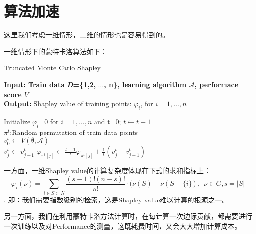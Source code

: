 \section{算法加速}
这里我们考虑一维情形，二维的情形也是容易得到的。

一维情形下的蒙特卡洛算法如下\cite{ghorbani2019data}：
\begin{algorithm}[H]
	\caption{Truncated Monte Carlo Shapley}%
	\label{alg1}
	\hspace*{0.02in} {\bf Input: Train data \textsl{D}=\{1,2, $\dots$, n\}, learning algorithm $\mathcal{A}$, performace score $V$}\\ %
	\hspace*{0.02in} {\bf Output:} %
	Shapley value of training points: $\varphi_{i}$, for $i=1,\dots,n$
	\begin{algorithmic}[1]
		\State Initialize $\varphi_{i}$=0 for $i=1,\dots,n$ and t=0;
		\State $t\leftarrow t+1$\\
		$\pi^t$:Random permutation of train data points\\
		$v_0^t\leftarrow V(\emptyset,\mathcal{A})$\\
		\State $v_{j}^t\leftarrow v_{j-1}^{t}$
		\Else {}
		\EndIf
		\State $\varphi_{\pi^t[j]}\leftarrow \frac{t-1}{t}\varphi_{\pi^t[j]}+\frac{1}{t}(v_j^t-v_{j-1}^t)$
		\EndFor
		\EndWhile
	\end{algorithmic}	
	
\end{algorithm}

一方面，一维Shapley value的计算复杂度体现在下式的求和指标上：
$$\varphi_i(\nu) = \sum_{i\in S\subset N}\frac{(s-1)!(n-s)!}{n!}\cdot (\nu(S)-\nu(S-\{i\}), \ \ \nu \in G, s=|S|$$. 
即：我们需要指数级别的检索，这是Shapley value难以计算的根源之一。

另一方面，我们在利用蒙特卡洛方法计算时，在每计算一次边际贡献，都需要进行一次训练以及对Performance的测量，这既耗费时间，又会大大增加计算成本。

